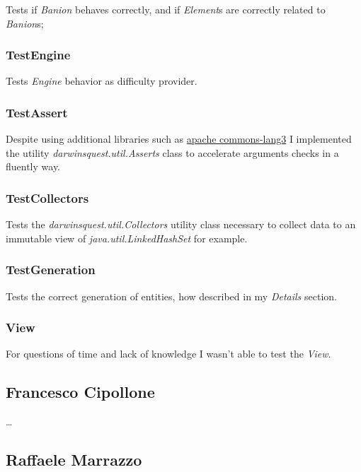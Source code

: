 \documentclass[12pt, a4paper]{report}
\begin{document}
    Tests if \emph{Banion} behaves correctly, and if \emph{Element}s are correctly related to \emph{Banion}s;

    \subsubsection{TestEngine}
    
    Tests \emph{Engine} behavior as difficulty provider.

    \subsubsection{TestAssert}
    
    Despite using additional libraries such as \href{https://commons.apache.org/proper/commons-lang/}{apache commons-lang3}
    I implemented the utility \emph{darwinsquest.util.Asserts} class to accelerate arguments checks in a fluently way.

    \subsubsection{TestCollectors}
    
    Tests the \emph{darwinsquest.util.Collectors} utility class necessary to collect data to an immutable view of \emph{java.util.LinkedHashSet} for example.

    \subsubsection{TestGeneration}
    
    Tests the correct generation of entities, how described in my \emph{Details} section.

    \subsubsection{View}

    For questions of time and lack of knowledge I wasn't able to test the \emph{View}.

    \subsection*{Francesco Cipollone}

    \dots

    \subsection*{Raffaele Marrazzo}
\end{document}
